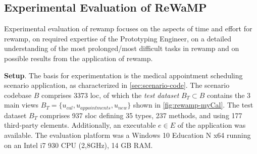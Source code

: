 \vspace{-15pt}
\hypertarget{sec:rewamp.experiment}{%
\subsection{Experimental Evaluation of ReWaMP}\label{sec:rewamp.experiment}}
\vspace{5pt}

Experimental evaluation of \gls{rewamp} focuses on the aspects of time and effort for \gls{rewamp}, on required expertise of the Prototyping Engineer, on a detailed understanding of the most prolonged/most difficult tasks in \gls{rewamp} and on possible results from the application of \gls{rewamp}.

\textbf{Setup}.
The basis for experimentation is the medical appointment scheduling scenario application, as characterized in \cref{sec:scenario-code}.
The scenario codebase \(B\) comprises 3373 \gls{loc}, of which the \emph{test dataset} \(B_T \subset B\) contains the 3 main views \(B_T = \{u_{cal}, u_{appointments}, u_{new}\}\) shown in \cref{fig:rewamp-myCal}.
The test dataset \(B_T\) comprises 937 \gls{sloc} defining 35 types, 237 methods, and using 177 third-party elements.
Additionally, an executable \(e \in E\) of the  application was available.
The evaluation platform was a Windows 10 Education N x64 running on an Intel i7 930 CPU (2,8GHz), 14 GB RAM.

